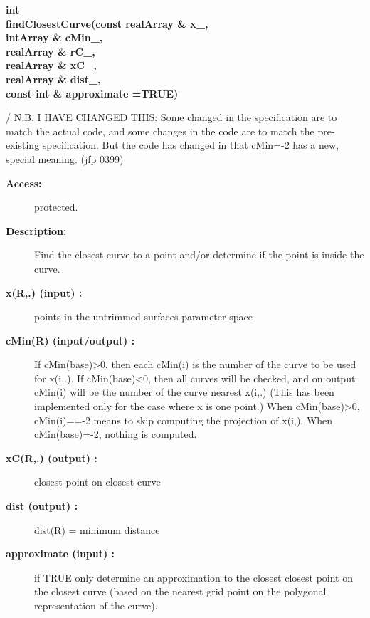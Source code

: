 \begin{flushleft} \textbf{%
int  \\ 
\settowidth{\TrimmedMappingIncludeArgIndent}{findClosestCurve(}%
findClosestCurve(const realArray \& x\_, \\ 
\hspace{\TrimmedMappingIncludeArgIndent}intArray  \& cMin\_, \\ 
\hspace{\TrimmedMappingIncludeArgIndent}realArray \& rC\_, \\ 
\hspace{\TrimmedMappingIncludeArgIndent}realArray \& xC\_, \\ 
\hspace{\TrimmedMappingIncludeArgIndent}realArray \& dist\_,\\ 
\hspace{\TrimmedMappingIncludeArgIndent}const int \& approximate  =TRUE) 
}\end{flushleft}
 / N.B. I HAVE CHANGED THIS: Some changed in the specification are to match the actual
 code, and some changes in the code are to match the pre-existing specification.
 But the code has changed in that cMin=-2 has a new, special meaning. (jfp 0399)
\begin{description}
\item[{\bf Access:}]  protected.
\item[{\bf Description:}] 
   Find the closest curve to a point and/or determine if the point is inside the curve.

\item[{\bf x(R,.) (input) :}]  points in the untrimmed surfaces parameter space
\item[{\bf cMin(R) (input/output) :}]  If cMin(base)>0, then each cMin(i) is the number of
 the curve to be used for x(i,.).  If cMin(base)<0, then all curves will be checked,
 and on output cMin(i) will be the number of the curve nearest x(i,.) (This has been
 implemented only for the case where x is one point.)
 When cMin(base)>0, cMin(i)==-2 means to skip computing the projection of x(i,).
 When cMin(base)=-2, nothing is computed.
\item[{\bf xC(R,.) (output) :}]  closest point on closest curve
\item[{\bf dist (output) :}]  dist(R) = minimum distance
\item[{\bf approximate (input) :}]  if TRUE only determine an approximation to the closest closest point
     on the closest curve (based on the nearest grid point on the polygonal representation of
     the curve).
 
\end{description}
